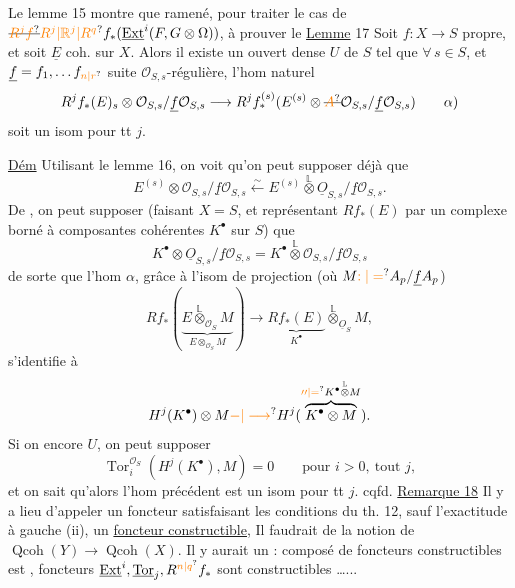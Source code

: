 Le lemme 15 montre que   ramené, pour traiter le cas de $\deleted{\unsure{R^j f}}\unsure{R^j|\mathbb R^j|R^q}f_*(\underline{\operatorname{Ext}}^i(F,G\otimes\Omega))$,  à prouver le
\uline{Lemme} 17 Soit $f:X\longrightarrow S$ propre,  et soit $\underline E$ coh. sur $X$. Alors il existe un ouvert dense $U$ de $S$ tel que $\forall\,s\in S$, et $\underline f=f_1,\ldots f_{\unsure{n|r}}$ suite $\mathcal O_{S,s}$-régulière, l'hom naturel
\[
 R^jf_*(E)_s\otimes\mathcal O_{S,s}/\underline f\mathcal O_{S,s}
 \longrightarrow R^j f^{(s)}_*(E^{(s)}\otimes\deleted{\unsure{A}}\mathcal O_{S,s}/\underline f\mathcal O_{S,s})
 \tag*{$\alpha$)}
\]
soit un isom pour tt $j$.

\uline{Dém} Utilisant le lemme 16, on voit qu'on peut supposer déjà que
\[
 E^{(s)}\otimes\mathcal O_{S,s}/\underline f\mathcal O_{S,s}
 \overset{\sim}{\longleftarrow}E^{(s)}\overset{\mathbb L}{\otimes}\underline{O}_{S,s}/\underline f\mathcal O_{S,s}.
\]
De , on peut supposer  (faisant $X=S$,  et représentant $Rf_*(E)$ par un complexe borné à composantes cohérentes $K^\bullet$ sur $S$) que
\[
 K^\bullet\otimes \underline{O}_{S,s}/\underline f\mathcal O_{S,s}
 =K^\bullet\overset{\mathbb L}{\otimes}\mathcal O_{S,s}/\underline f\mathcal O_{S,s}
\]
de sorte que l'hom $\alpha$, grâce à l'isom de projection (où $M\unsure{:|=}A_p/\underline f A_p$)
\[
 Rf_*(\underbrace{E\overset{\mathbb L}{\otimes}_{\mathcal O_S}M}_{E\otimes_{\mathcal O_S}M})
 \longrightarrow\underbrace{Rf_*(E)}_{K^\bullet}\overset{\mathbb L}{\otimes}_{\underline{O}_S}M,
\]
s'identifie à
\[
 H^j(K^\bullet)\otimes M\unsure{-|\longrightarrow} H^j(\overbrace{K^\bullet\otimes M}^{\unsure{\prime\prime|=}K^\bullet\overset{\mathbb L}{\otimes}M}).
\]
Si on  encore $U$, on peut supposer
\[
 \operatorname{Tor}_i^{\mathcal O_S}(H^j(K^\bullet),M)=0\qquad\text{pour }i>0,\ \text{tout }j,
\]
et on sait qu'alors l'hom précédent est un isom pour tt $j$. \quad cqfd.
\uline{Remarque 18} Il y a lieu d'appeler un foncteur  satisfaisant les conditions du th. 12, sauf l'exactitude à gauche (ii), un \uline{foncteur constructible}, Il faudrait   de  la notion de   $\operatorname{Qcoh}(Y)\longrightarrow\operatorname{Qcoh}(X)$. Il y aurait un  : composé de foncteurs constructibles est , foncteurs $\underline{\operatorname{Ext}}^i,\underline{\operatorname{Tor}}_j,R^{\unsure{n|q}} f_*$ sont constructibles \ldots{}...

